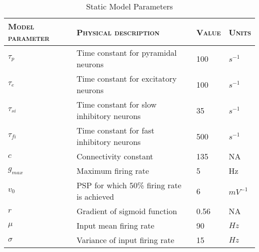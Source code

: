 \singlespacing
\small
\begin{center}
	\begin{table}
			\caption{Static Model Parameters}
		\begin{tabular}{||p{4cm}|p{6cm}|p{1.5cm}|p{1.2cm}||}\hline
			 \textsc{Model parameter}  & \textsc{Physical description} & \textsc{Value} & \textsc{Units}  \\\hline\hline
			 $\tau_{p}$ & Time constant for pyramidal neurons & 100 & $s^{-1}$\\\hline
			 $\tau_{e}$ & Time constant for excitatory neurons & 100 & $s^{-1}$\\\hline
			 $\tau_{si}$ & Time constant for slow inhibitory neurons & 35 & $s^{-1}$\\\hline
			 $\tau_{fi}$ & Time constant for fast inhibitory neurons & 500 & $s^{-1}$\\\hline
			 $c$ & Connectivity constant & 135 & NA\\\hline
			 $g_{max}$ & Maximum firing rate & 5 & Hz \\\hline
			 $v_{0}$ & PSP for which 50\% firing rate is achieved & 6 & $mV^{-1}$\\\hline
			 $r$ & Gradient of sigmoid function & 0.56 & NA \\\hline
			 $\mu$ & Input mean firing rate & 90 & $Hz$\\\hline
			 $\sigma$ & Variance of input firing rate & 15 & $Hz$\\\hline\hline 
		\end{tabular}
		\label{tab: Static}
	\end{table}
\end{center}

